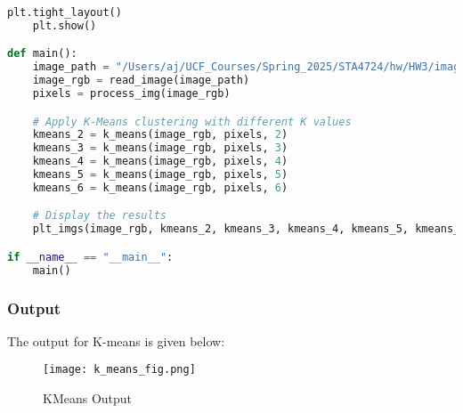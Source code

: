 \documentclass[12pt,letterpaper]{article}
\begin{document}
\begin{lstlisting}[language=Python, breaklines=true, columns=flexible, frame=single]
    plt.tight_layout()
    plt.show()

def main():
    image_path = "/Users/aj/UCF_Courses/Spring_2025/STA4724/hw/HW3/image.jpg"
    image_rgb = read_image(image_path)
    pixels = process_img(image_rgb)

    # Apply K-Means clustering with different K values
    kmeans_2 = k_means(image_rgb, pixels, 2)
    kmeans_3 = k_means(image_rgb, pixels, 3)
    kmeans_4 = k_means(image_rgb, pixels, 4)
    kmeans_5 = k_means(image_rgb, pixels, 5)
    kmeans_6 = k_means(image_rgb, pixels, 6)

    # Display the results
    plt_imgs(image_rgb, kmeans_2, kmeans_3, kmeans_4, kmeans_5, kmeans_6)

if __name__ == "__main__":
    main()
\end{lstlisting}
\pagebreak
\subsubsection*{Output}
The output for K-means is given below:
\begin{figure}[H]  %
    \centering
    \texttt{[image: k\_means\_fig.png]}
    \caption{KMeans Output}
    \label{Fig:1}
\end{figure}

\vspace{-0.2in}  %
\pagebreak
\end{document}
